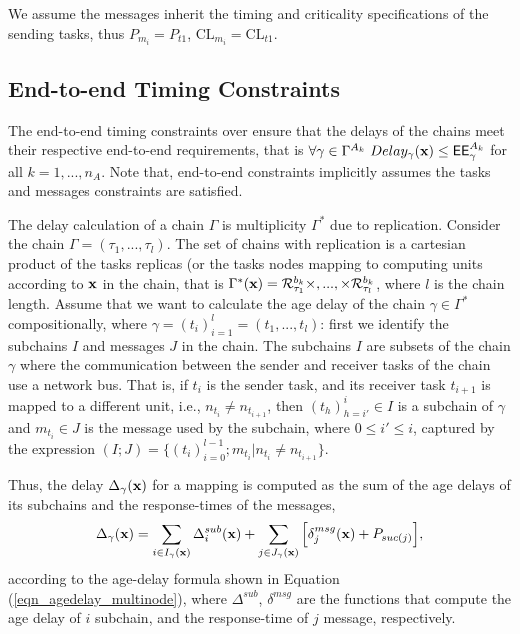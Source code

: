 We assume the messages inherit the timing and criticality specifications of the sending tasks, thus $P_{m_i }= P_{t1}$, $\mathrm{CL}_{m_i}=\mathrm{CL}_{t1}$.

\subsection{End-to-end Timing Constraints}
The end-to-end timing constraints over \ttx ensure that the delays of the chains meet their respective end-to-end requirements, that is $\forall \gamma\in \ssp{\Gamma}\ Delay_\gamma(\x)\leq \sss{\EE}[k][\gamma]$ for all $k=1,...,n_A$. Note that, end-to-end constraints implicitly assumes the tasks and messages constraints are satisfied.

The delay calculation of a chain $\Gamma$ is multiplicity $\Gamma^*$ due to replication. Consider the chain $\Gamma=(\tau_1,...,\tau_l)$. The set of chains with replication is a cartesian product of the tasks replicas (or the tasks nodes mapping to computing units according to $\textbf{x}$ in the chain, that is $\Gamma^*(\x)= \sss{\mathcal{R}}[k][\tau_1][b]\times,...,\times\sss{\mathcal{R}}[k][\tau_l][b]$, where $l$ is the chain length. Assume that we want to calculate the age delay of the chain $\gamma\in \Gamma^*$ compositionally, where $\gamma=(t_i)_{i=1}^l=(t_1,...,t_l)$: first we identify the subchains $I$ and messages $J$ in the chain. The subchains $I$ are subsets of the chain $\gamma$ where the communication between the sender and receiver tasks of the chain use a network bus. That is, if $t_i$ is the sender task, and its receiver task $t_{i+1}$ is mapped to a different unit, i.e., $n_{t_i}\neq n_{t_{i+1}}$, then $(t_h)_{h=i'}^i\in I$ is a subchain of $\gamma$ and $m_{t_i}\in J$ is the message used by the subchain, where $0\leq i'\leq i$, captured by the expression
$
	(I;J)=\{(t_i)_{i=0}^{l-1};m_{t_i} | n_{t_i}\neq n_{t_{i+1}}\}
$.
	
Thus, the delay $\Delta_\gamma(\textbf{x})$ for a mapping \ttx is computed as the sum of the age delays of its subchains and the response-times of the messages,
\[
	\Delta_{\gamma}(\textbf{x})=\sum_{i\in I_{\gamma}(\textbf{x})}{\Delta^{sub}_{i}(\textbf{x})} + \sum_{j\in J_{\gamma}(\textbf{x})}{\Big[\delta^{msg}_j(\textbf{x})+P_{suc(j)}\Big]},
\]
according to the age-delay formula shown in Equation (\ref{eqn_agedelay_multinode}), where $\Delta^{sub}$, $\delta^{msg}$ are the functions that compute the age delay of $i$ subchain, and the response-time of $j$ message, respectively. 

